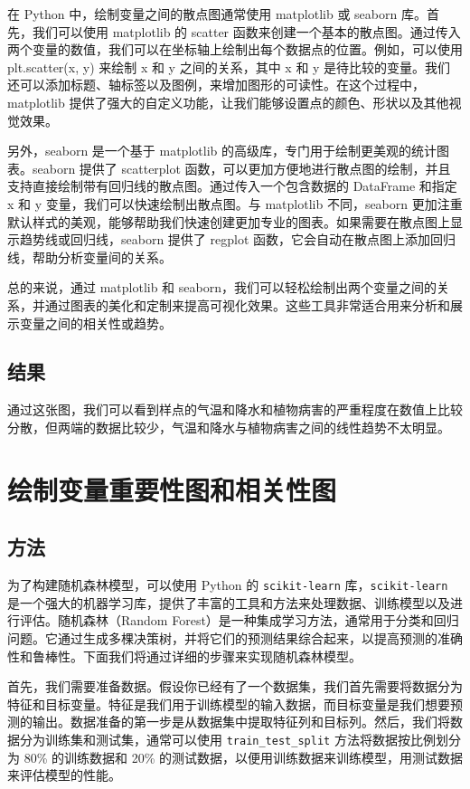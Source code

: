 \documentclass[AutoFakeBold]{LZUThesis-PgD&PhD}
\begin{document}
在 Python 中，绘制变量之间的散点图通常使用 matplotlib 或 seaborn 库。首先，我们可以使用 matplotlib 的 scatter 函数来创建一个基本的散点图。通过传入两个变量的数值，我们可以在坐标轴上绘制出每个数据点的位置。例如，可以使用 plt.scatter(x, y) 来绘制 x 和 y 之间的关系，其中 x 和 y 是待比较的变量。我们还可以添加标题、轴标签以及图例，来增加图形的可读性。在这个过程中，matplotlib 提供了强大的自定义功能，让我们能够设置点的颜色、形状以及其他视觉效果。

另外，seaborn 是一个基于 matplotlib 的高级库，专门用于绘制更美观的统计图表。seaborn 提供了 scatterplot 函数，可以更加方便地进行散点图的绘制，并且支持直接绘制带有回归线的散点图。通过传入一个包含数据的 DataFrame 和指定 x 和 y 变量，我们可以快速绘制出散点图。与 matplotlib 不同，seaborn 更加注重默认样式的美观，能够帮助我们快速创建更加专业的图表。如果需要在散点图上显示趋势线或回归线，seaborn 提供了 regplot 函数，它会自动在散点图上添加回归线，帮助分析变量间的关系。

总的来说，通过 matplotlib 和 seaborn，我们可以轻松绘制出两个变量之间的关系，并通过图表的美化和定制来提高可视化效果。这些工具非常适合用来分析和展示变量之间的相关性或趋势。

\subsection{结果}

通过这张图，我们可以看到样点的气温和降水和植物病害的严重程度在数值上比较分散，但两端的数据比较少，气温和降水与植物病害之间的线性趋势不太明显。

\section{绘制变量重要性图和相关性图}


    	\subsection{方法}
	
        为了构建随机森林模型，可以使用 Python 的 \texttt{scikit-learn} 库，\texttt{scikit-learn} 是一个强大的机器学习库，提供了丰富的工具和方法来处理数据、训练模型以及进行评估。随机森林（Random Forest）是一种集成学习方法，通常用于分类和回归问题。它通过生成多棵决策树，并将它们的预测结果综合起来，以提高预测的准确性和鲁棒性。下面我们将通过详细的步骤来实现随机森林模型。

        首先，我们需要准备数据。假设你已经有了一个数据集，我们首先需要将数据分为特征和目标变量。特征是我们用于训练模型的输入数据，而目标变量是我们想要预测的输出。数据准备的第一步是从数据集中提取特征列和目标列。然后，我们将数据分为训练集和测试集，通常可以使用 \texttt{train\_test\_split} 方法将数据按比例划分为 80\% 的训练数据和 20\% 的测试数据，以便用训练数据来训练模型，用测试数据来评估模型的性能。
        
\end{document}
